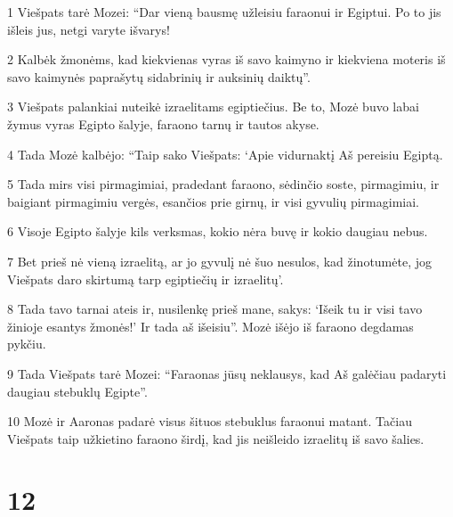 \par 1 Viešpats tarė Mozei: “Dar vieną bausmę užleisiu faraonui ir Egiptui. Po to jis išleis jus, netgi varyte išvarys! 
\par 2 Kalbėk žmonėms, kad kiekvienas vyras iš savo kaimyno ir kiekviena moteris iš savo kaimynės paprašytų sidabrinių ir auksinių daiktų”. 
\par 3 Viešpats palankiai nuteikė izraelitams egiptiečius. Be to, Mozė buvo labai žymus vyras Egipto šalyje, faraono tarnų ir tautos akyse. 
\par 4 Tada Mozė kalbėjo: “Taip sako Viešpats: ‘Apie vidurnaktį Aš pereisiu Egiptą. 
\par 5 Tada mirs visi pirmagimiai, pradedant faraono, sėdinčio soste, pirmagimiu, ir baigiant pirmagimiu vergės, esančios prie girnų, ir visi gyvulių pirmagimiai. 
\par 6 Visoje Egipto šalyje kils verksmas, kokio nėra buvę ir kokio daugiau nebus. 
\par 7 Bet prieš nė vieną izraelitą, ar jo gyvulį nė šuo nesulos, kad žinotumėte, jog Viešpats daro skirtumą tarp egiptiečių ir izraelitų’. 
\par 8 Tada tavo tarnai ateis ir, nusilenkę prieš mane, sakys: ‘Išeik tu ir visi tavo žinioje esantys žmonės!’ Ir tada aš išeisiu”. Mozė išėjo iš faraono degdamas pykčiu. 
\par 9 Tada Viešpats tarė Mozei: “Faraonas jūsų neklausys, kad Aš galėčiau padaryti daugiau stebuklų Egipte”. 
\par 10 Mozė ir Aaronas padarė visus šituos stebuklus faraonui matant. Tačiau Viešpats taip užkietino faraono širdį, kad jis neišleido izraelitų iš savo šalies.



\chapter{12}


